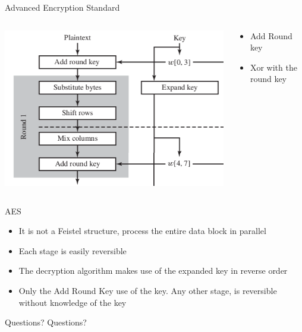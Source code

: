 \documentclass{beamer}
\begin{document}
\begin{frame}{Advanced Encryption Standard}
\begin{columns}[onlytextwidth]
    \begin{column}{0.6\textwidth}
  \begin{center}
    \includegraphics[width=1\linewidth]{AES-round}
  \end{center}
    \end{column}
    \begin{column}{0.4\textwidth}
  \begin{itemize}
  \item Add Round key
  \item Xor with the round key
  \end{itemize}
    \end{column}
    \end{columns}
\end{frame}


\begin{frame}{AES}
  \begin{itemize}
  \item It is not a Feistel structure, process the entire data block in parallel
  \item Each stage is easily reversible
  \item The decryption algorithm makes use of the
    expanded key in reverse order
  \item Only the Add Round Key use of the key. Any other stage,
    is reversible without knowledge of the key
  \end{itemize}
\end{frame}

\begin{frame}{Questions?}
  Questions?
\end{frame}
\end{document}
